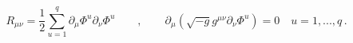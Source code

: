 \begin{equation} R_{\mu\nu}=\frac{1}{2}\sum_{u=1}^q \partial_\mu \Phi^u 
\partial_\nu \Phi^u
\qquad,\qquad \partial_\mu(\sqrt{-g}g^{\mu\nu}\partial_\nu\Phi^u)=0 \quad
u=1,...,q\, .
\end{equation} 
